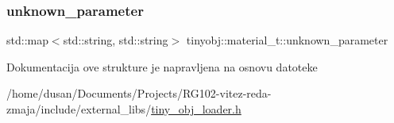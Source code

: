 \mbox{\label{structtinyobj_1_1material__t_a18b700227c94d410ed1aa550c7fa9226}} 
\subsubsection{\texorpdfstring{unknown\+\_\+parameter}{unknown\_parameter}}
{\footnotesize\ttfamily std\+::map$<$std\+::string, std\+::string$>$ tinyobj\+::material\+\_\+t\+::unknown\+\_\+parameter}



Dokumentacija ove strukture je napravljena na osnovu datoteke \begin{DoxyCompactItemize}
\item 
/home/dusan/\+Documents/\+Projects/\+R\+G102-\/vitez-\/reda-\/zmaja/include/external\+\_\+libs/\hyperlink{tiny__obj__loader_8h}{tiny\+\_\+obj\+\_\+loader.\+h}\end{DoxyCompactItemize}
